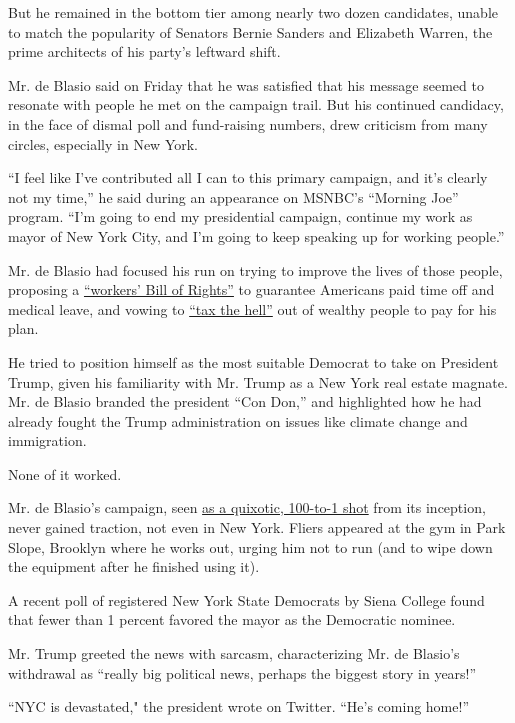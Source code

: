 But he remained in the bottom tier among nearly two dozen candidates,
unable to match the popularity of Senators Bernie Sanders and Elizabeth
Warren, the prime architects of his party's leftward shift.

Mr. de Blasio said on Friday that he was satisfied that his message
seemed to resonate with people he met on the campaign trail. But his
continued candidacy, in the face of dismal poll and fund-raising
numbers, drew criticism from many circles, especially in New York.

``I feel like I've contributed all I can to this primary campaign, and
it's clearly not my time,'' he said during an appearance on MSNBC's
``Morning Joe'' program. ``I'm going to end my presidential campaign,
continue my work as mayor of New York City, and I'm going to keep
speaking up for working people.''

Mr. de Blasio had focused his run on trying to improve the lives of
those people, proposing a
\href{https://www.buzzfeednews.com/article/billdeblasio/bill-de-blasio-working-peoples-bill-of-rights}{``workers'
Bill of Rights''} to guarantee Americans paid time off and medical
leave, and vowing to \href{https://www.taxthehell.com/}{``tax the
hell''} out of wealthy people to pay for his plan.

He tried to position himself as the most suitable Democrat to take on
President Trump, given his familiarity with Mr. Trump as a New York real
estate magnate. Mr. de Blasio branded the president ``Con Don,'' and
highlighted how he had already fought the Trump administration on issues
like climate change and immigration.

None of it worked.

Mr. de Blasio's campaign, seen
\href{https://www.nytimes3xbfgragh.onion/2019/05/10/nyregion/de-blasio-2020-president-ny.html}{as
a quixotic, 100-to-1 shot} from its inception, never gained traction,
not even in New York. Fliers appeared at the gym in Park Slope, Brooklyn
where he works out, urging him not to run (and to wipe down the
equipment after he finished using it).

A recent poll of registered New York State Democrats by Siena College
found that fewer than 1 percent favored the mayor as the Democratic
nominee.

Mr. Trump greeted the news with sarcasm, characterizing Mr. de Blasio's
withdrawal as ``really big political news, perhaps the biggest story in
years!''

``NYC is devastated," the president wrote on Twitter. ``He's coming
home!''

